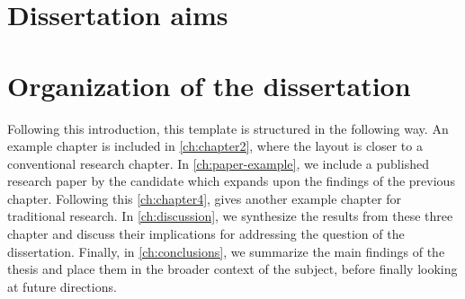 \section{Dissertation aims}

\section{Organization of the dissertation}


Following this introduction, this template is structured in the following way. An example chapter is included in \cref{ch:chapter2}, where the layout is closer to a conventional research chapter. In \cref{ch:paper-example}, we include a published research paper by the candidate which expands upon the findings of the previous chapter. Following this \cref{ch:chapter4}, gives another example chapter for traditional research. In \cref{ch:discussion}, we synthesize the results from these three chapter and discuss their implications for addressing the question of the dissertation. Finally, in \cref{ch:conclusions}, we summarize the main findings of the thesis and place them in the broader context of the subject, before finally looking at future directions.

